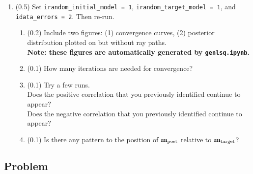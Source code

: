 \documentclass[11pt,titlepage,fleqn]{article}
\begin{document}
\begin{enumerate}

\item (0.5) Set \verb+irandom_initial_model = 1+, \verb+irandom_target_model = 1+, and \verb+idata_errors = 2+. Then re-run.
%
\begin{enumerate}
\item (0.2) Include two figures: (1) convergence curves, (2) posterior distribution plotted on  but without ray paths. \\
{\bf Note: these figures are automatically generated by \verb+genlsq.ipynb+.}
\item (0.1) How many iterations are needed for convergence?
\item (0.1) Try a few runs. \\
Does the positive correlation that you previously identified continue to appear? \\
Does the negative correlation that you previously identified continue to appear?
\item (0.1) Is there any pattern to the position of $\mbox{${\bf m}$}_{\rm post}$ relative to $\mbox{${\bf m}$}_{\rm target}$?
\end{enumerate}

\end{enumerate}


\pagebreak

\subsection*{Problem} \howmuchtime\




\clearpage\pagebreak
%


\end{document}
